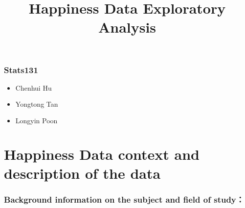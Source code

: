 \documentclass[11pt]{article}
\title{Happiness Data Exploratory Analysis}
\providecommand{\tightlist}{%
      \setlength{\itemsep}{0pt}\setlength{\parskip}{0pt}}
\begin{document}
    
    
    \maketitle
    
    

    
    \subsubsection{Stats131}\label{stats131}

\begin{itemize}
\tightlist
\item
  Chenhui Hu
\item
  Yongtong Tan
\item
  Longyin Poon
\end{itemize}

\section{Happiness Data context and description of the
data}\label{happiness-data-context-and-description-of-the-data}

\subsubsection{Background information on the subject and field of
study：}\label{background-information-on-the-subject-and-field-of-study}
\end{document}
